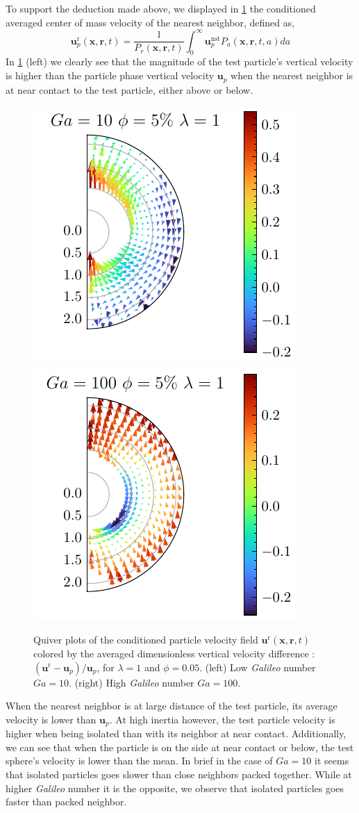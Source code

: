 To support the deduction made above, we displayed in \ref{fig:unst_ga} the conditioned averaged center of mass velocity of the nearest neighbor, defined as,
\begin{equation*}
    \textbf{u}^\text{r}_p(\textbf{x},\textbf{r},t)  
    =
    \frac{1}{P_r(\textbf{x},\textbf{r},t)}
    \int_0^\infty \textbf{u}^\text{nst}_pP_a(\textbf{x},\textbf{r},t,a) da
\end{equation*}
In \ref{fig:unst_ga} (left) we clearly see that the magnitude of the test particle's vertical velocity is higher than the particle phase vertical velocity $\textbf{u}_p$ when the nearest neighbor is at near contact to the test particle, either above or below.
\begin{figure}[h!]
    \centering
    \includegraphics[height=0.35\textwidth]{image/HOMOGENEOUS_NEW/Dist/U_l_1_Ga_10_PHI_5.pdf}
    \includegraphics[height=0.35\textwidth]{image/HOMOGENEOUS_NEW/Dist/U_l_1_Ga_100_PHI_5.pdf}
    \caption{
         Quiver plots of the conditioned particle velocity field $\textbf{u}^\text{r}(\textbf{x},\textbf{r},t)$ colored by the averaged dimensionless vertical velocity difference : $(\textbf{u}^\text{r} - \textbf{u}_p )/ \textbf{u}_p$, for $\lambda = 1$ and $\phi = 0.05$. 
         (left) Low \textit{Galileo} number $Ga = 10$.
        (right) High \textit{Galileo} number $Ga = 100$.
         }
    \label{fig:unst_ga}
\end{figure}
When the nearest neighbor is at large distance of the test particle, its average velocity is lower than $\textbf{u}_p$. 
At high inertia however, the test particle velocity is higher when being isolated than with its neighbor at near contact. 
Additionally, we can see that when the particle is on the side at near contact or below, the test sphere's velocity  is lower than the mean. 
In brief in the case of $Ga = 10$ it seems that isolated particles goes slower than close neighbors packed together. 
While at higher \textit{Galileo} number it is the opposite, we observe that isolated particles  goes faster than packed neighbor. 


